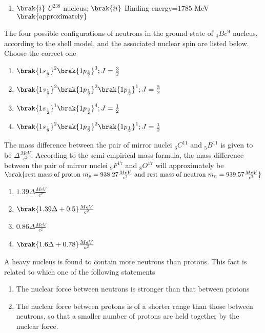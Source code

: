 {{\begin{enumerate}
\item $\brak{i}$ $U^{238}$ nucleus; $\brak{ii}$ Binding energy=$1785$ MeV $\brak{\text{approximately}}$
\end{enumerate}
}
\item{
The four possible configurations of neutrons in the ground state of $_4Be^9$ nucleus, according to the shell model, and the associated nuclear spin are listed below. Choose the correct one
\begin{multicols}{2}
\begin{enumerate}
\item $\brak{1s_\frac{1}{2}}^2\brak{1p_\frac{3}{2}}^3;J=\frac{3}{2}$
\item $\brak{1s_\frac{1}{2}}^2\brak{1p_\frac{1}{2}}^2\brak{1p_\frac{3}{2}}^1;J=\frac{3}{2}$
\item $\brak{1s_\frac{1}{2}}^1\brak{1p_\frac{3}{2}}^4;J=\frac{1}{2}$
\item $\brak{1s_\frac{1}{2}}^2\brak{1p_\frac{3}{2}}^2\brak{1p_\frac{1}{2}}^1;J=\frac{1}{2}$
\end{enumerate}
\end{multicols}
}
\item{
The mass difference between the pair of mirror nuclei $_6C^11$ and $_5B^{11}$ is given to be $\Delta\frac{MeV}{c^2}$. According to the semi-empirical mass formula, the mass difference between the pair of mirror nuclei $_9F^{17}$ and $_8O^{17}$ will approximately be $\brak{\text{rest mass of proton }m_p=938.27\frac{MeV}{c^2}\text{ and rest mass of neutron }m_n=939.57\frac{MeV}{c^2}}$
\begin{multicols}{2}
\begin{enumerate}
\item $1.39\Delta\frac{MeV}{c^2}$ 
\item $\brak{1.39\Delta+0.5}\frac{MeV}{c^2}$
\item $0.86\Delta\frac{MeV}{c^2}$ 
\item $\brak{1.6\Delta+0.78}\frac{MeV}{c^2}$
\end{enumerate}
\end{multicols}
}
\item{
A heavy nucleus is found to contain more neutrons than protons. This fact is related to which one of the following statements
\begin{enumerate}
\item The nuclear force between neutrons is stronger than that between protons
\item The nuclear force between protons is of a shorter range than those between neutrons, so that a smaller number of protons are held together by the nuclear force.

\end{enumerate}}}
